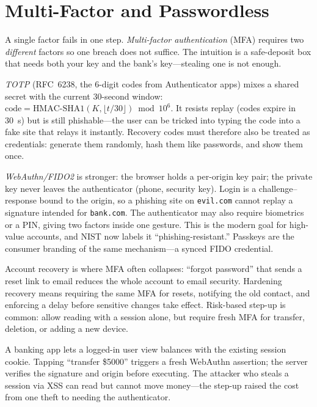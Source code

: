 \section{Multi-Factor and Passwordless}\label{sec:mfa}
A single factor fails in one step. \emph{Multi-factor authentication} (MFA) requires two \emph{different} factors so one breach does not suffice. The intuition is a safe-deposit box that needs both your key and the bank's key---stealing one is not enough.

\emph{TOTP} (RFC~6238, the 6-digit codes from Authenticator apps) mixes a shared secret with the current 30-second window: $\text{code}= \text{HMAC-SHA1}(K, \lfloor t/30\rfloor)\bmod 10^6$. It resists replay (codes expire in 30~s) but is still phishable---the user can be tricked into typing the code into a fake site that relays it instantly. Recovery codes must therefore also be treated as credentials: generate them randomly, hash them like passwords, and show them once.

\emph{WebAuthn/FIDO2} is stronger: the browser holds a per-origin key pair; the private key never leaves the authenticator (phone, security key). Login is a challenge--response bound to the origin, so a phishing site on \texttt{evil.com} cannot replay a signature intended for \texttt{bank.com}. The authenticator may also require biometrics or a PIN, giving two factors inside one gesture. This is the modern goal for high-value accounts, and NIST now labels it ``phishing-resistant.'' Passkeys are the consumer branding of the same mechanism---a synced FIDO credential.

Account recovery is where MFA often collapses: ``forgot password'' that sends a reset link to email reduces the whole account to email security. Hardening recovery means requiring the same MFA for resets, notifying the old contact, and enforcing a delay before sensitive changes take effect. Risk-based step-up is common: allow reading with a session alone, but require fresh MFA for transfer, deletion, or adding a new device.

\begin{example}
A banking app lets a logged-in user view balances with the existing session cookie. Tapping ``transfer \$5000'' triggers a fresh WebAuthn assertion; the server verifies the signature and origin before executing. The attacker who steals a session via XSS can read but cannot move money---the step-up raised the cost from one theft to needing the authenticator.
\end{example}

